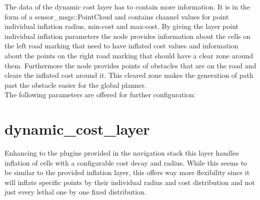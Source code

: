 The data of the dynamic cost layer has to contain more information. It is in the form of a sensor\_msgs::PointCloud and contains channel values for point individual inflation radius, min-cost and max-cost. By giving the layer point individual inflation parameters the node provides information about the cells on the left road marking that need to have inflated cost values and information about the points on the right road marking that should have a clear zone around them. Furthermore the node provides points of obstacles that are on the road and clears the inflated cost around it. This cleared zone makes the generation of path past the obstacle easier for the global planner.\\

The following parameters are offered for further configuration:

\begin{table}[H]
\centering
{}

\caption{MarkeFreeSpace parameters}
\label{markfreespaceparams}
\end{table}

\section{dynamic\_cost\_layer}
Enhancing to the plugins provided in the navigation stack this layer handles inflation of cells with a configurable cost decay and radius. While this seems to be similar to the provided inflation layer, this offers way more flexibility since it will inflate specific points by their individual radius and cost distribution and not just every lethal one by one fixed distribution.\\

